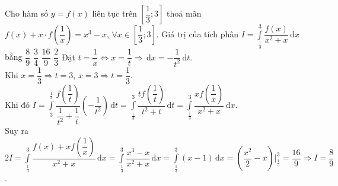 \begin{ex}%
	Cho hàm số $y=f(x)$ liên tục trên $\left[\dfrac{1}{3};3\right]$ thoả mãn $f(x)+x\cdot f\left(\dfrac{1}{x}\right)=x^3-x$, $\forall x\in \left[\dfrac{1}{3};3\right]$. 
	Giá trị của tích phân $I=\displaystyle\int\limits_{\frac{1}{3}}^{3} \dfrac{f(x)}{x^2+x} \mathrm{\,d}x$ bằng	
	\choice
	{\True $\dfrac{8}{9}$}
	{$\dfrac{3}{4}$}
	{$\dfrac{16}{9}$}
	{$\dfrac{2}{3}$}
	\loigiai
	{
		Đặt $t=\dfrac{1}{x}\Leftrightarrow x=\dfrac{1}{t}\Rightarrow  \mathrm{\,d}x=-\dfrac{1}{t^2}\mathrm{\,d}t$.\\
		Khi $x=\dfrac{1}{3}\Rightarrow t=3$, $x=3\Rightarrow t=\dfrac{1}{3}$.\\
		Khi đó $I=\displaystyle\int\limits_{3}^{\frac{1}{3}} \dfrac{f\left(\dfrac{1}{t}\right)}{\dfrac{1}{t^2}+\dfrac{1}{t}} \left(-\dfrac{1}{t^2}\right)\mathrm{\,d}t=\displaystyle\int\limits_{\frac{1}{3}}^{3} \dfrac{tf\left(\dfrac{1}{t}\right)}{t^2+t} \mathrm{\,d}t=\displaystyle\int\limits_{\frac{1}{3}}^{3} \dfrac{xf\left(\dfrac{1}{x}\right)}{x^2+x} \mathrm{\,d}x$.\\
		Suy ra $2I=\displaystyle\int\limits_{\frac{1}{3}}^{3} \dfrac{f(x)+xf\left(\dfrac{1}{x}\right)}{x^2+x} \mathrm{\,d}x=\displaystyle\int\limits_{\frac{1}{3}}^{3} \dfrac{x^3-x}{x^2+x} \mathrm{\,d}x=\displaystyle\int\limits_{\frac{1}{3}}^{3} (x-1) \mathrm{\,d}x=\left(\dfrac{x^2}{2}-x\right)\bigg|_{\frac{1}{3}}^3=\dfrac{16}{9}\Rightarrow I=\dfrac{8}{9}$.
	}
\end{ex}

